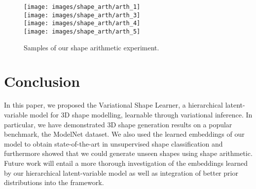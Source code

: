 \documentclass[10pt,twocolumn,letterpaper]{article}
\begin{document}
\begin{figure}[ht!]
  \vspace{-0.75em}
  \centering
  \texttt{[image: images/shape\_arth/arth\_1]}  \\
  \texttt{[image: images/shape\_arth/arth\_3]}  \\
  \texttt{[image: images/shape\_arth/arth\_4]}  \\
  \texttt{[image: images/shape\_arth/arth\_5]}  \\
  \caption{Samples of our shape arithmetic experiment.}
  \label{fig:shapearith}
  \vspace{-0.75em}
\end{figure}

\section{Conclusion}
\label{chp:conclusion}
In this paper, we proposed the Variational Shape Learner, a hierarchical latent-variable model for 3D shape modelling, learnable through variational inference. In particular, we have demonstrated 3D shape generation results on a popular benchmark, the ModelNet dataset. We also used the learned embeddings of our model to obtain state-of-the-art in unsupervised shape classification and furthermore showed that we could generate unseen shapes using shape arithmetic. Future work will entail a more thorough investigation of the embeddings learned by our hierarchical latent-variable model as well as integration of better prior distributions into the framework.


{\small


}
\end{document}
